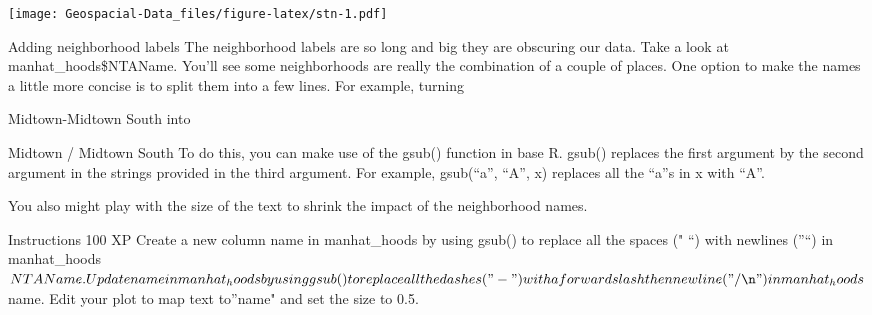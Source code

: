 \documentclass[]{article}
\newenvironment{Shaded}{\begin{snugshade}}{\end{snugshade}}
\newcommand{\CharTok}[1]{\textcolor[rgb]{0.31,0.60,0.02}{#1}}
\newcommand{\CommentTok}[1]{\textcolor[rgb]{0.56,0.35,0.01}{\textit{#1}}}
\newcommand{\DataTypeTok}[1]{\textcolor[rgb]{0.13,0.29,0.53}{#1}}
\newcommand{\FloatTok}[1]{\textcolor[rgb]{0.00,0.00,0.81}{#1}}
\newcommand{\KeywordTok}[1]{\textcolor[rgb]{0.13,0.29,0.53}{\textbf{#1}}}
\newcommand{\NormalTok}[1]{#1}
\newcommand{\OperatorTok}[1]{\textcolor[rgb]{0.81,0.36,0.00}{\textbf{#1}}}
\newcommand{\StringTok}[1]{\textcolor[rgb]{0.31,0.60,0.02}{#1}}
\begin{document}
\texttt{[image: Geospacial-Data\_files/figure-latex/stn-1.pdf]}

Adding neighborhood labels The neighborhood labels are so long and big
they are obscuring our data. Take a look at manhat\_hoods\$NTAName.
You'll see some neighborhoods are really the combination of a couple of
places. One option to make the names a little more concise is to split
them into a few lines. For example, turning

Midtown-Midtown South into

Midtown / Midtown South To do this, you can make use of the gsub()
function in base R. gsub() replaces the first argument by the second
argument in the strings provided in the third argument. For example,
gsub(``a'', ``A'', x) replaces all the ``a''s in x with ``A''.

You also might play with the size of the text to shrink the impact of
the neighborhood names.

Instructions 100 XP Create a new column name in manhat\_hoods by using
gsub() to replace all the spaces (" ``) with newlines (''\n``) in
manhat\_hoods\(NTAName. Update name in manhat_hoods by using gsub() to replace all the dashes ("-") with a forward slash then newline ("/\n") in manhat_hoods\)name.
Edit your plot to map text to''name" and set the size to 0.5.

\begin{Shaded}
\end{Shaded}
\end{document}
